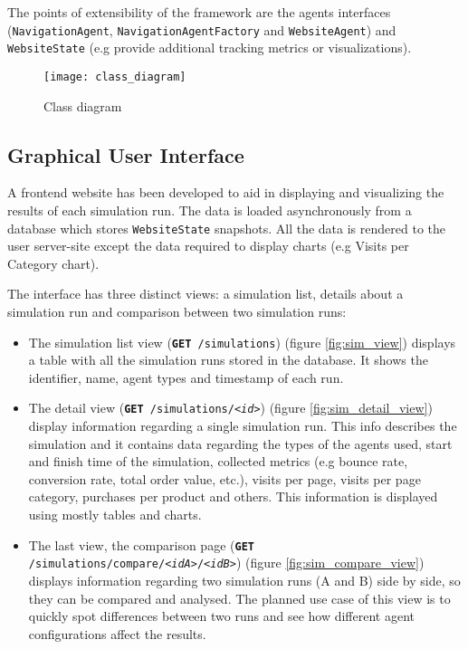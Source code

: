 The points of extensibility of the framework are the agents interfaces 
(\texttt{NavigationAgent}, \texttt{NavigationAgentFactory} and 
\texttt{WebsiteAgent}) and \texttt{WebsiteState} (e.g provide additional 
tracking metrics or visualizations).

\begin{figure}[p]
    \begin{center}
        \leavevmode
        \texttt{[image: class\_diagram]}
        \caption{Class diagram}
        \label{fig:class}
    \end{center}
\end{figure}


\subsection{Graphical User Interface}

A frontend website has been developed to aid in displaying and visualizing the 
results of each simulation run. The data is loaded asynchronously from a 
database which stores \texttt{WebsiteState} snapshots. All the data is rendered 
to the user server-site except the data required to display charts (e.g Visits 
per Category chart).

The interface has three distinct views: a simulation list, details about a 
simulation run and comparison between two simulation runs:

\begin{itemize}
    \item The simulation list view (\texttt{\textbf{GET} /simulations}) (figure 
    \ref{fig:sim_view}) displays a table 
    with all the simulation runs stored in the database. It shows the 
    identifier, name, agent types and timestamp of each run.
    \item The detail view (\texttt{\textbf{GET} /simulations/\textit{<id>}}) 
    (figure \ref{fig:sim_detail_view})
    display information regarding a single simulation run. This info describes 
    the simulation and it contains data regarding the types of the agents used, 
    start and finish time of the simulation, collected metrics (e.g bounce 
    rate, conversion rate, total order value, etc.), visits per page, visits 
    per page category, purchases per product and others. This information is 
    displayed using mostly tables and charts.
    \item The last view, the comparison page (\texttt{\textbf{GET} 
    /simulations/compare/\textit{<idA>}/\textit{<idB>}}) (figure 
    \ref{fig:sim_compare_view}) displays information 
    regarding two simulation runs (A and B) side by side, so they can be 
    compared and analysed. The planned use case of this view is to quickly spot 
    differences between two runs and see how different agent configurations 
    affect the results.
\end{itemize}


